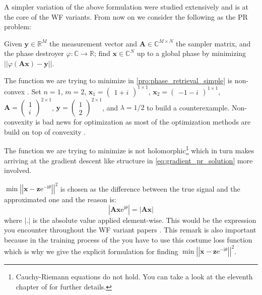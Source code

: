   A simpler variation of the above formulation were studied extensively and is at the core of the \ac{WF} variants. 
  From now on we consider the following as the \acl*{PR} problem:

  \begin{Pro}\label{pro:phase_retrieval_simple}
    Given $\boldsymbol{y} \in \mathbb{R}^M$ the measurement vector and $\boldsymbol{A} \in \mathbb{C}^{M \times N}$ the sampler matrix, 
    and the phase destroyer $\varphi \colon \mathbb{C} \to \mathbb{R}$; find $\boldsymbol{x} \in \mathbb{C}^N$ up to a global phase 
    by minimizing $ \left|\left|\varphi(\boldsymbol{A}\boldsymbol{x})-\boldsymbol{y}\right|\right|$.
  \end{Pro}
  \begin{Rem}
The function we are trying to minimize in \cref{pro:phase_retrieval_simple} is non-convex \cite{Candes2014}. Set $n=1$, $m=2$, $\boldsymbol{x}_1 = \begin{pmatrix}1+i\end{pmatrix}^{1 \times 1}$, 
$\boldsymbol{x}_2 = \begin{pmatrix}-1-i\end{pmatrix}^{1 \times 1}$, $\boldsymbol{A}=\begin{pmatrix}1\\i \end{pmatrix}^{2 \times 1}$, 
$\boldsymbol{y}=\begin{pmatrix}1\\2 \end{pmatrix}^{2 \times 1}$, and $\lambda=1/2$ to build a counterexample. Non-convexity is bad news for 
optimization as most of the optimization methods are build on top of convexity \cite{Boyd2004}\cite{Nocedal2006}.
  \end{Rem}
  \begin{Rem}
    The function we are trying to minimize is not holomorphic\footnote{Cauchy-Riemann equations do not hold. 
    You can take a look at the eleventh chapter of \cite{Rudin1987} for further details.} which in turn makes arriving at the 
    gradient descent like structure in \cref{eq:gradient_pr_solution} more involved.
  \end{Rem}
  \begin{Rem} 
    $\min \left|\left|\boldsymbol{x}-\boldsymbol{z}\mathrm{e}^{-\mathrm{i}\theta}\right|\right|^2$ is chosen as the difference between the 
    true signal and the approximated one and the reason is:
    \begin{equation}
      \left|\boldsymbol{A}\boldsymbol{x}\mathrm{e}^{\mathrm{i}\theta}\right| = \left|\boldsymbol{A}\boldsymbol{x}\right|
    \end{equation}
    where $\left|\boldsymbol{.}\right|$ is the absolute value applied element-wise. This would be the expression you encounter throughout the \ac{WF} variant papers \cite{Candes2014}\cite{Chen2015}\cite{Zhang2016}. 
    This remark is also important because in the training process of the \du you have to use this costume loss function which is why we give the explicit formulation 
    for finding $\min \left|\left|\boldsymbol{x}-\boldsymbol{z}\mathrm{e}^{-\mathrm{i}\theta}\right|\right|^2$.
  \end{Rem}
